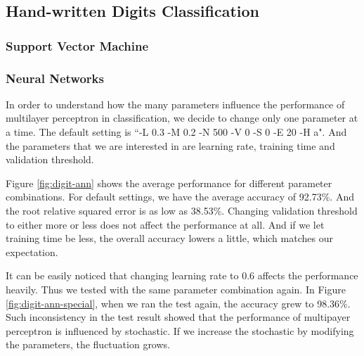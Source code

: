 \documentclass[11pt]{article}
\begin{document}
\subsection{Hand-written Digits Classification}
\subsubsection{Support Vector Machine}

\subsubsection{Neural Networks}
In order to understand how the many parameters influence the performance of multilayer perceptron in classification, we decide to change only one parameter at a time. The default setting is ``-L 0.3 -M 0.2 -N 500 -V 0 -S 0 -E 20 -H a". And the parameters that we are interested in are learning rate, training time and validation threshold.

Figure \ref{fig:digit-ann} shows the average performance for different parameter combinations. For default settings, we have the average accuracy of 92.73\%. And the root relative squared error is as low as 38.53\%. Changing validation threshold to either more or less does not affect the performance at all. And if we let training time be less, the overall accuracy lowers a little, which matches our expectation.

It can be easily noticed that changing learning rate to 0.6 affects the performance heavily. Thus we tested with the same parameter combination again. In Figure \ref{fig:digit-ann-special}, when we ran the test again, the accuracy grew to 98.36\%. Such inconsistency in the test result showed that the performance of multipayer perceptron is influenced by stochastic. If we increase the stochastic by modifying the parameters, the fluctuation grows.
\end{document}
